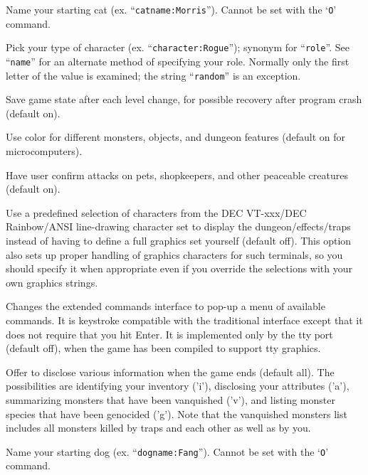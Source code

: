 \item[\ib{catname}]
Name your starting cat (ex. ``{\tt catname:Morris}'').
Cannot be set with the `{\tt O}' command.

\item[\ib{character}]
Pick your type of character (ex. ``{\tt character:Rogue}'');
synonym for ``{\tt role}''.  See ``{\tt name}'' for an alternate method
of specifying your role.  Normally only the first letter of
the value is examined; the string ``{\tt random}'' is an exception.

\item[\ib{checkpoint}]
Save game state after each level change, for possible recovery after
program crash (default on).

\item[\ib{color}]
Use color for different monsters, objects, and dungeon features
(default on for microcomputers).

\item[\ib{confirm}]
Have user confirm attacks on pets, shopkeepers, and other
peaceable creatures (default on).

\item[\ib{DECgraphics}]
Use a predefined selection of characters from the DEC VT-xxx/DEC
Rainbow/ANSI line-drawing character set to display the dungeon/effects/traps
instead of having to define a full graphics set yourself (default off).
This option also sets up proper handling of graphics
characters for such terminals, so you should specify it when appropriate
even if you override the selections with your own graphics strings.

\item[\ib{extmenu}]
Changes the extended commands interface to pop-up a menu of available commands.
It is keystroke compatible with the traditional interface except that it does
not require that you hit Enter. It is implemented only by the tty port 
(default off), when the game has been compiled to support tty graphics.

\item[\ib{disclose}]
Offer to disclose various information when the game ends (default all).
The possibilities are identifying your inventory ('i'),
disclosing your attributes ('a'), summarizing monsters that have been
vanquished ('v'), and listing monster species that have been genocided ('g').
Note that the vanquished monsters list includes all monsters killed by
traps and each other as well as by you.

\item[\ib{dogname}]
Name your starting dog (ex. ``{\tt dogname:Fang}'').
Cannot be set with the `{\tt O}' command.

